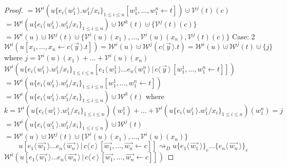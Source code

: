 \documentclass[a4paper,UKenglish,cleveref, autoref]{lipics-v2019}
\newcommand{\set}[1]{ \{ #1 \} }
\newcommand{\fake}[3]{#1 \langle \, #2 \, \rangle . #3}
\newcommand{\share}[3]{#1 [#2 \leftarrow #3]}
\newcommand{\dist}[5]{#1 [ #2 \, \vert \, \fakedist{#4}{#5} \, #3 ]}
\newcommand{\fakedist}[2]{#1 \langle \, #2 \, \rangle}
\newcommand{\sub}[3]{#1 \{ #2 / #3 \}}
\newcommand{\exor}[3]{#1 \{ \fakedist{#2}{#3} \}_{e}}
\newcommand{\weight}[2]{\mathcal{W}^{#1}(#2)}
\newcommand{\weightvar}[2]{\mathcal{V}^{#1}(#2)}
\begin{document}
\begin{proof}
\newline
$=  \weight{i}{\sub{u}{\fake{e_{i}}{w^{i}_{1}}{w^{i}_{1}}}{x_{i}}_{1 \leq i \leq n} \share{}{w^{1}_{1}, \dots, w^{n}_{1}}{t}} \cupdot  \weightvar{j}{t}(c)$
\newline
$= \weight{i}{\sub{u}{\fake{e_{i}}{w^{i}_{1}}{w^{i}_{1}}}{x_{i}}_{1 \leq i \leq n}} \cupdot \weight{k}{t} \cupdot  \set{\weightvar{j}{t}(c)}$
\newline
$= \weight{i}{u} \cupdot \weight{j}{t} \cupdot \set{\weightvar{i}{u}(x_{1}), \dots, \weightvar{i}{u}(x_{n}),  \weightvar{j}{t}(c)}$
\newline
Case: 2
\newline
$\weight{i}{\share{u}{x_{1}, \dots, x_{n}}{\fake{c}{\vec{y}}{t}}} = \weight{i}{u} \cupdot \weight{j}{\fake{c}{\vec{y}}{t}} = \weight{i}{u} \cupdot \weight{j}{t} \cupdot \set{j}$
\newline
where $j = \weightvar{i}{u}(x_{1}) + \dots + \weightvar{i}{u}(x_{n})$
\newline
$\weight{i}{\sub{u}{\fake{e_{i}}{w^{i}_{1}}{w^{i}_{1}}}{x_{i}}_{1 \leq i \leq n} \dist{}{\fakedist{e_{1}}{w^{1}_{1}} \dots \fakedist{e_{n}}{w^{n}_{1}}}{\share{}{w^{1}_{1}, \dots, w^{n}_{1}}{t}}{c}{\vec{y}}}$
\newline
$= \weight{i}{\sub{u}{\fake{e_{i}}{w^{i}_{1}}{w^{i}_{1}}}{x_{i}}_{1 \leq i \leq n} \share{}{w^{1}_{1}, \dots, w^{n}_{1}}{t}}$
\newline
$= \weight{i}{\sub{u}{\fake{e_{i}}{w^{i}_{1}}{w^{i}_{1}}}{x_{i}}_{1 \leq i \leq n} } \cupdot \weight{k}{t}$
\newline
where $k = \weightvar{i}{\sub{u}{\fake{e_{i}}{w^{i}_{1}}{w^{i}_{1}}}{x_{i}}_{1 \leq i \leq n}}(w^{1}_{1}) + \dots + \weightvar{i}{\sub{u}{\fake{e_{i}}{w^{i}_{1}}{w^{i}_{1}}}{x_{i}}_{1 \leq i \leq n}}(w^{n}_{1}) = j$
\newline
$= \weight{i}{\sub{u}{\fake{e_{i}}{w^{i}_{1}}{w^{i}_{1}}}{x_{i}}_{1 \leq i \leq n} } \cupdot \weight{j}{t}$
\newline
$= \weight{i}{u} \cupdot \weight{j}{t} \cupdot \set{\weightvar{i}{u}(x_{1}), \dots, \weightvar{i}{u}(x_{n})}$
\newline
$$\dist{u}{\fakedist{e_{1}}{\vec{w_{1}}} \dots \fakedist{e_{n}}{\vec{w_{n}}}}{\share{}{\vec{w_{1}}, \dots, \vec{w_{n}}}{c}}{c}{c} \rightsquigarrow_{D} \exor{\exor{u}{e_{1}}{\vec{w_{1}}} \dots}{e_{n}}{\vec{w_{n}}}$$
$\weight{i}{\dist{u}{\fakedist{e_{1}}{\vec{w_{1}}} \dots \fakedist{e_{n}}{\vec{w_{n}}}}{\share{}{\vec{w_{1}}, \dots, \vec{w_{n}}}{c}}{c}{c}}$
\newline

\end{proof}
\end{document}
